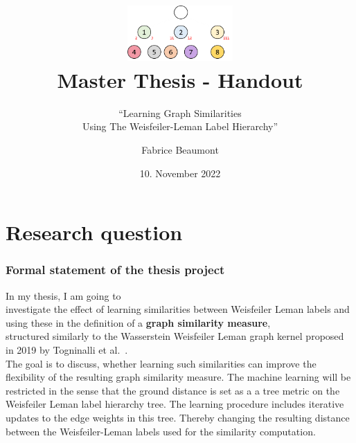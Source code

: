 
\usepackage[
	backend=biber,
	sortlocale=en_US,
	natbib=true,
	url=false, 
	doi=true,
	eprint=false
]{biblatex}


\title[Master thesis - Handout]{
	\centering
	\includegraphics[width=0.3\textwidth]{images/WLLT}\\
	Master Thesis - Handout
}
\subtitle{\enquote{Learning Graph Similarities\\Using The Weisfeiler-Leman Label Hierarchy}}
\author[F. Beaumont]{Fabrice Beaumont}
\date{10. November 2022}

\newcommand{\figureWidth}{7cm}
\newcommand{\figureHorizontal}{2cm}
\newcommand{\figureVertical}{5cm}

\begin{frame}
	\titlepage
\end{frame}

\section{Research question}

\begin{frame}
\frametitle{Formal statement of the thesis project}
	In my thesis, I am going to\\
	investigate the effect of learning similarities between Weisfeiler Leman labels and using these in the definition of a \textbf{graph similarity measure},\\
	structured similarly to the Wasserstein Weisfeiler Leman graph kernel proposed in 2019 by Togninalli et al.~\cite{2019_Togninalli_NIPS}.\\
	
	The goal is to discuss, whether learning such similarities can improve the flexibility of the resulting graph similarity measure.
	The machine learning will be restricted in the sense that the ground distance is set as a a tree metric on the Weisfeiler Leman label hierarchy tree. 
	The learning procedure includes iterative updates to the edge weights in this tree. Thereby changing the resulting distance between the Weisfeiler-Leman labels used for the similarity computation.
\end{frame}

